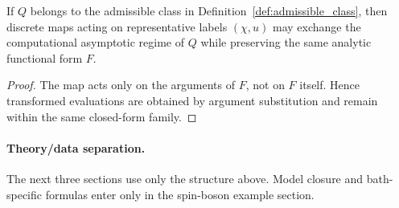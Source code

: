 \begin{proposition}
\label{prop:admissibility}
If \(Q\) belongs to the admissible class in Definition~\ref{def:admissible_class}, then discrete
maps acting on representative labels \((\chi,u)\) may exchange the computational asymptotic regime
of \(Q\) while preserving the same analytic functional form \(F\).
\end{proposition}
\begin{proof}
The map acts only on the arguments of \(F\), not on \(F\) itself. Hence transformed evaluations are
obtained by argument substitution and remain within the same closed-form family.
\end{proof}

\paragraph{Theory/data separation.}
The next three sections use only the structure above. Model closure and bath-specific formulas enter
only in the spin-boson example section.
